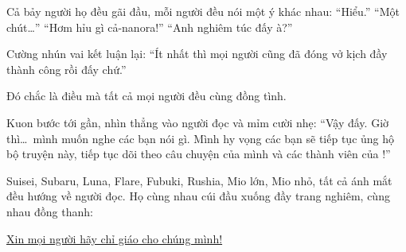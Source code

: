 \documentclass[../main.tex]{subfiles}
\begin{document}
Cả bảy người họ đều gãi đầu, mỗi người đều nói một ý khác nhau: ``Hiểu.'' ``Một chút\dots'' ``Hơm hỉu gì cả-nanora!'' ``Anh nghiêm túc đấy à?''

Cường nhún vai kết luận lại: ``Ít nhất thì mọi người cũng đã đóng vở kịch đầy thành công rồi đấy chứ.''

Đó chắc là điều mà tất cả mọi người đều cùng đồng tình.

Kuon bước tới gần, nhìn thẳng vào người đọc và mỉm cười nhẹ: ``Vậy đấy. Giờ thì\dots\ mình muốn nghe các bạn nói gì. Mình hy vọng các bạn sẽ tiếp tục ủng hộ bộ truyện này, tiếp tục dõi theo câu chuyện của mình và các thành viên của \hll!''

Suisei, Subaru, Luna, Flare, Fubuki, Rushia, Mio lớn, Mio nhỏ, tất cả ánh mắt đều hướng về người đọc. Họ cùng nhau cúi đầu xuống đầy trang nghiêm, cùng nhau đồng thanh:

\begin{center}
  \uline{Xin mọi người hãy chỉ giáo cho chúng mình!}
\end{center}
\end{document}
